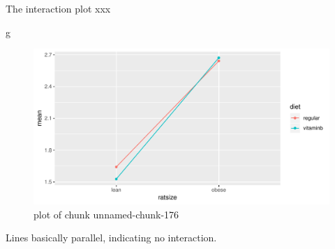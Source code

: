 \documentclass[ignorenonframetext,]{beamer}
\newenvironment{Shaded}{\begin{snugshade}}{\end{snugshade}}
\newcommand{\NormalTok}[1]{#1}
\begin{document}
\begin{frame}[fragile]{The interaction plot xxx}
\protect\hypertarget{the-interaction-plot-xxx}{}

\begin{Shaded}
\begin{Highlighting}[]
\NormalTok{g}
\end{Highlighting}
\end{Shaded}

\begin{figure}
\centering
\includegraphics{figure/unnamed-chunk-176-1.pdf}
\caption{plot of chunk unnamed-chunk-176}
\end{figure}

Lines basically parallel, indicating no interaction.

\end{frame}
\end{document}
